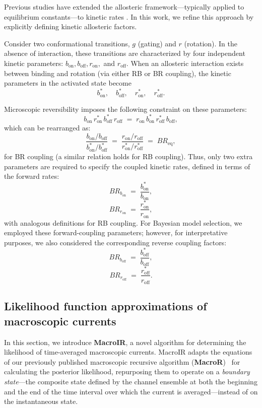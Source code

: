 \documentclass[pdflatex,sn-nature]{sn-jnl}%
\begin{document}
Previous studies have extended the allosteric framework—typically applied to equilibrium constants—to kinetic rates \cite{Moffatt_hume}. In this work, we refine this approach by explicitly defining kinetic allosteric factors.

Consider two conformational transitions, \(g\) (gating) and \(r\) (rotation). In the absence of interaction, these transitions are characterized by four independent kinetic parameters: \(b_{\text{on}}, b_{\text{off}}, r_{\text{on}},\) and \(r_{\text{off}}\). When an allosteric interaction exists between binding and rotation (via either RB or BR coupling), the kinetic parameters in the activated state become
\[
b^*_{\text{on}},\quad b^*_{\text{off}},\quad r^*_{\text{on}},\quad r^*_{\text{off}}.
\]

Microscopic reversibility imposes the following constraint on these parameters:
\[
b_{\text{on}} \, r^*_{\text{on}} \, b^*_{\text{off}} \, r_{\text{off}} \;=\; r_{\text{on}} \, b^*_{\text{on}} \, r^*_{\text{off}} \, b_{\text{off}},
\]
which can be rearranged as:
\[
\frac{b_{\text{on}}/b_{\text{off}}}{b^*_{\text{on}}/b^*_{\text{off}}} \;=\; \frac{r_{\text{on}}/r_{\text{off}}}{r^*_{\text{on}}/r^*_{\text{off}}} \;=\; BR_{\text{eq}},
\]
for BR coupling (a similar relation holds for RB coupling). Thus, only two extra parameters are required to specify the coupled kinetic rates, defined in terms of the forward rates:
\[
BR_{b_{\text{on}}} \;=\; \frac{b^*_{\text{on}}}{b_{\text{on}}},
\]
\[
BR_{r_{\text{on}}} \;=\; \frac{r^*_{\text{on}}}{r_{\text{on}}},
\]
with analogous definitions for RB coupling. For Bayesian model selection, we employed these forward-coupling parameters; however, for interpretative purposes, we also considered the corresponding reverse coupling factors:
\[
BR_{b_{\text{off}}} \;=\; \frac{b^*_{\text{off}}}{b_{\text{off}}},
\]
\[
BR_{r_{\text{off}}} \;=\; \frac{r^*_{\text{off}}}{r_{\text{off}}}.
\]

\subsection{Likelihood function approximations of macroscopic currents}
In this section, we introduce \textbf{MacroIR}, a novel algorithm for determining the likelihood of time-averaged macroscopic currents. MacroIR adapts the equations of our previously published macroscopic recursive algorithm (\textbf{MacroR})~\cite{Moffatt} for calculating the posterior likelihood, repurposing them to operate on a \emph{boundary state}---the composite state defined by the channel ensemble at both the beginning and the end of the time interval over which the current is averaged---instead of on the instantaneous state.
\end{document}
